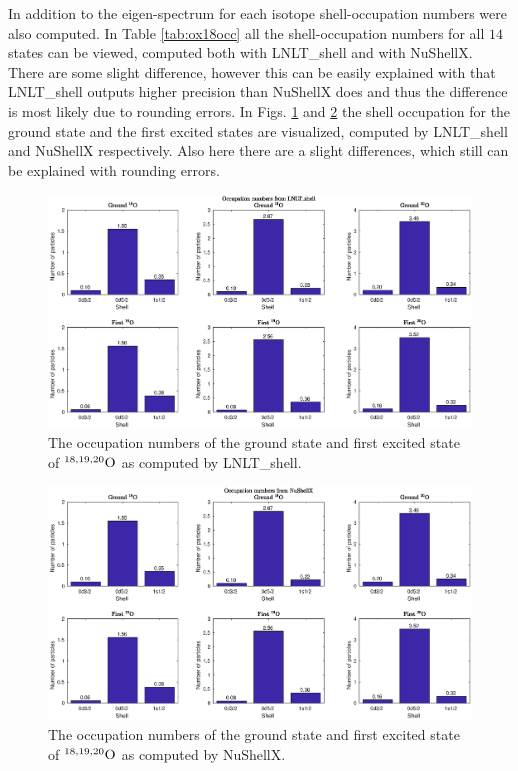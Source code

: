 \twocolumngrid

In addition to the eigen-spectrum for each isotope shell-occupation numbers were also computed. In Table \ref{tab:ox18occ} all the shell-occupation numbers for all \(14\) states can be viewed, computed both with LNLT\_shell and with NuShellX. There are some slight difference, however this can be easily explained with that LNLT\_shell outputs higher precision than NuShellX does and thus the difference is most likely due to rounding errors. In Figs. \ref{fig:occnum_lnlt} and \ref{fig:occnum_nushellx} the shell occupation for the ground state and the first excited states are visualized, computed by LNLT\_shell and NuShellX respectively. Also here there are a slight differences, which still can be explained with rounding errors. \\

\onecolumngrid

\begin{figure}[H]
  \begin{center}
  \includegraphics[scale=0.5]{occupation_numbers_lnlt.eps}
  \caption{The occupation numbers of the ground state and first excited state of \(^{18,19,20}\rm{O}\) as computed by LNLT\_shell.}
  \label{fig:occnum_lnlt}
  \end{center}
\end{figure}

\begin{figure}[H]
  \begin{center}
  \includegraphics[scale=0.5]{occupation_numbers_nushellx.eps}
  \caption{The occupation numbers of the ground state and first excited state of \(^{18,19,20}\rm{O}\) as computed by NuShellX.}
  \label{fig:occnum_nushellx}
  \end{center}
\end{figure}

\twocolumngrid
